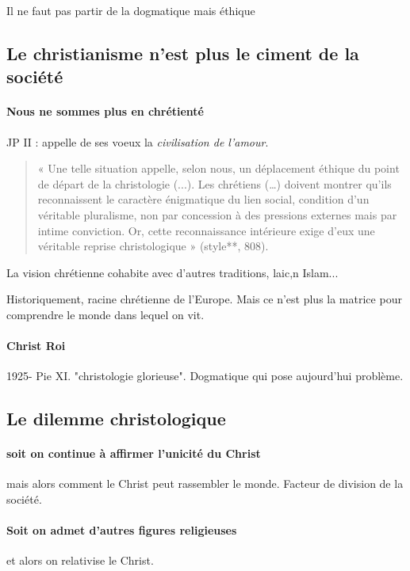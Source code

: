 Il ne faut pas partir de la dogmatique mais éthique

\subsection{Le christianisme n’est plus le ciment de la société}

\paragraph{Nous ne sommes plus en chrétienté} JP II : appelle de ses voeux la \textit{civilisation de l'amour}.

\begin{quote}
    « Une telle situation appelle, selon nous, un déplacement éthique du point de départ de la christologie (...). Les chrétiens (…) doivent montrer qu’ils reconnaissent le caractère énigmatique du lien social, condition d’un véritable pluralisme, non par concession à des pressions externes mais par intime conviction. Or, cette reconnaissance intérieure exige d’eux une véritable reprise christologique » (style**, 808).
\end{quote}


La vision chrétienne cohabite avec d'autres traditions, laic,n Islam...
\begin{Ex}
Historiquement, racine chrétienne de l'Europe.  Mais ce n'est plus la matrice pour comprendre le monde dans lequel on vit.  
\end{Ex}

\paragraph{Christ Roi} 1925- Pie XI. "christologie glorieuse". Dogmatique qui pose aujourd'hui problème.
 \subsection{Le dilemme christologique}
 

\paragraph{soit on continue à affirmer l'unicité du Christ} mais alors comment le Christ peut rassembler le monde. Facteur de division de la société.

\paragraph{Soit on admet d'autres figures religieuses } et alors on relativise le Christ.

